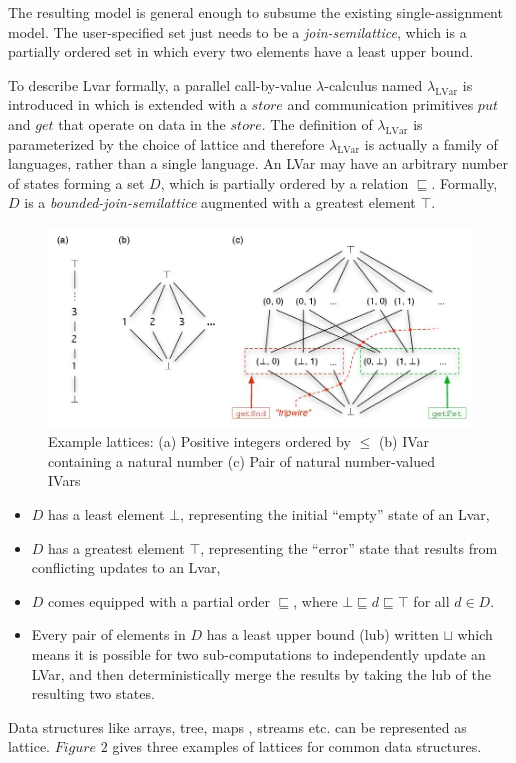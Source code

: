 \documentclass[twocolumn]{article}
\newcommand{\lambdaLVar}{\ensuremath{\lambda_{\textrm{LVar}}}}
\newcommand{\userleq}{\ensuremath{\sqsubseteq}}
\begin{document}
The resulting model is general enough to subsume the existing single-assignment model. The user-specified set just needs to be a \textit{join-semilattice}, which is a partially ordered set in which every two elements have a least upper bound. 

To describe Lvar formally, a parallel call-by-value $\lambda$-calculus named $\lambdaLVar$ is introduced in \cite{lkuper} which is extended with a $store$ and communication primitives $put$ and $get$ that operate on data in the $store$. The definition of $\lambdaLVar$ is parameterized by the choice of lattice and therefore $\lambdaLVar$ is actually a family of languages, rather than a single language. An LVar may have an arbitrary number of states forming a set $D$, which is partially ordered by a relation $\userleq$. Formally, $D$ is a \emph{bounded-join-semilattice} augmented with a greatest element $\top$. 

\begin{figure}
\centerline{
\includegraphics[width=1.0\columnwidth]{Figures/lattice.jpg}
}
\caption{Example lattices\cite{lkuper}: (a) Positive integers ordered by $\leq$ (b) IVar containing a natural number (c) Pair of natural number-valued IVars}
\label{Figure1}
\end{figure}
\begin{itemize}
\item $D$ has a least element $\bot$, representing the initial “empty” state of an Lvar,
\item $D$ has a greatest element $\top$, representing the “error” state that results from conflicting updates to an Lvar,
\item $D$ comes equipped with a partial order $\userleq$, where $\bot \userleq d \userleq \top$ for all $d \in D$.
\item Every pair of elements in $D$ has a least upper bound (lub) written $\sqcup$ which means it is possible for two sub-computations to independently update an LVar, and then deterministically merge the results by taking the lub of the resulting two states.
\end{itemize}
Data structures like arrays, tree, maps , streams etc. can be represented  as lattice. $Figure$ $2$ gives three examples of lattices for common data structures.
 
\end{document}

